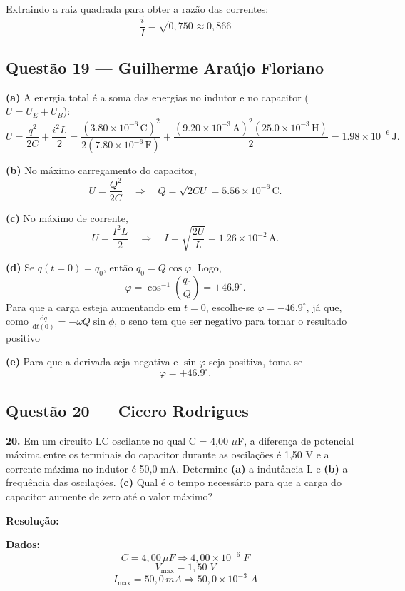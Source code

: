\documentclass[12pt,a4paper]{article}
\begin{document}
Extraindo a raiz quadrada para obter a razão das correntes:
\begin{equation*}
\frac{i}{I} = \sqrt{0,750} \approx 0,866
\end{equation*}


\subsection{Questão 19 — Guilherme Araújo Floriano}

\textbf{(a)} A energia total é a soma das energias no indutor e no capacitor ($U = U_E + U_B$):
\[
U = \frac{q^2}{2C} + \frac{i^2L}{2}
= \frac{(3.80\times10^{-6}\,\mathrm{C})^2}{2(7.80\times10^{-6}\,\mathrm{F})}
 + \frac{(9.20\times10^{-3}\,\mathrm{A})^2(25.0\times10^{-3}\,\mathrm{H})}{2}
= 1.98\times10^{-6}\,\mathrm{J}.
\]

\textbf{(b)} No máximo carregamento do capacitor,
\[
U = \frac{Q^2}{2C}
\quad\Rightarrow\quad
Q = \sqrt{2CU}
= 5.56\times10^{-6}\,\mathrm{C}.
\]

\textbf{(c)} No máximo de corrente,
\[
U = \frac{I^2L}{2}
\quad\Rightarrow\quad
I = \sqrt{\frac{2U}{L}}
= 1.26\times10^{-2}\,\mathrm{A}.
\]

\textbf{(d)} Se $q(t=0)=q_0$, então $q_0=Q\cos\varphi$. Logo,
\[
\varphi = \cos^{-1}\!\left(\frac{q_0}{Q}\right)=\pm 46.9^\circ.
\]
Para que a carga esteja aumentando em $t=0$, escolhe-se $\varphi=-46.9^\circ$, já que, como $\frac{\mathrm{d}q}{\mathrm{d}t(0)} = -\omega Q \sin{\phi}$, o seno tem que ser negativo para tornar o resultado positivo

\textbf{(e)} Para que a derivada seja negativa e $\sin\varphi$ seja positiva, toma-se
\[
\varphi=+46.9^\circ.
\]

\subsection{Questão 20 — Cicero Rodrigues}


\textbf{20. }\normalfont Em um circuito LC oscilante no qual C = 4,00 $\mu$F, a diferença de potencial máxima entre os terminais do capacitor durante as oscilações é 1,50 V e a corrente máxima no indutor é 50,0 mA. Determine \textbf{(a)} a indutância L e \textbf{(b)} a frequência das oscilações. \textbf{(c)} Qual é o tempo necessário para que a carga do capacitor aumente de zero até o valor máximo?

\textbf{Resolução:}
\vspace{0.3cm}

\textbf{Dados:}
\[C = 4,00\,\mu F \Rightarrow 4,00 \times 10^{-6}\;F\]
\[V_{\max} = 1,50\;V\]
\[I_{\max} = 50,0\,mA \Rightarrow 50,0 \times 10^{-3}\;A\]
\end{document}
